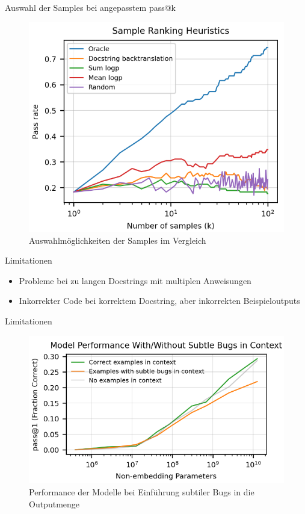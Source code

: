 \documentclass{beamer}              %
\begin{document}
\begin{frame}{Auswahl der Samples bei angepasstem pass@k}
    \begin{figure}
        \centering
        \includegraphics[width=0.55\paperwidth]{images/heuristcs.png}
        \caption{Auswahlmöglichkeiten der Samples im Vergleich\cite{chen2021evaluating}}
    \end{figure}
\end{frame}

\begin{frame}{Limitationen}
\begin{itemize}
    \item Probleme bei zu langen Docstrings mit multiplen Anweisungen
    \item Inkorrekter Code bei korrektem Docstring, aber inkorrekten Beispieloutputs
\end{itemize}
\end{frame}

\begin{frame}{Limitationen}
    \begin{figure}
        \centering
        \includegraphics[width=0.6\paperwidth]{images/bugsinexamples.png}
        \caption{Performance der Modelle bei Einführung subtiler Bugs in die Outputmenge\cite{chen2021evaluating}}
    \end{figure}
\end{frame}
\end{document}
